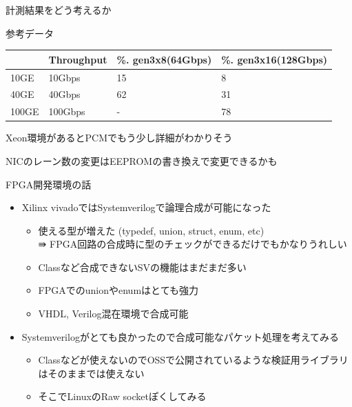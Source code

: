 \documentclass[10pt, compress]{beamer}
\begin{document}

\begin{frame}[fragile,t]{計測結果をどう考えるか}
	\vspace{-2em}
	\begin{figure}
		\resizebox{.8\textwidth}{!}{}
	\end{figure}
	\vspace{-2em}

	\begin{table}
	\small{参考データ}
	\begin{tabular}{l|l|l|l}
		\toprule
		  & Throughput & \%. gen3x8(64Gbps) & \%. gen3x16(128Gbps) \\
		\midrule
		10GE & 10Gbps & 15  & 8 \\
		40GE & 40Gbps & 62  & 31 \\
		100GE & 100Gbps & - & 78 \\
		\bottomrule
	\end{tabular}
	\end{table}

	\small{Xeon環境があるとPCMでもう少し詳細がわかりそう}

	\small{NICのレーン数の変更はEEPROMの書き換えで変更できるかも}

\end{frame}




\begin{frame}[fragile,t]{FPGA開発環境の話}
\begin{itemize}
	\item Xilinx vivadoではSystemverilogで論理合成が可能になった
	\vspace{-0.7em}
	\begin{itemize}
		\item 使える型が増えた (typedef, union, struct, enum, etc) \\
		      ⇛ FPGA回路の合成時に型のチェックができるだけでもかなりうれしい
		\item Classなど合成できないSVの機能はまだまだ多い
		\item FPGAでのunionやenumはとても強力
		\item VHDL, Verilog混在環境で合成可能
	\end{itemize}
	\item Systemverilogがとても良かったので合成可能なパケット処理を考えてみる
	\begin{itemize}
		\item Classなどが使えないのでOSSで公開されているような検証用ライブラリはそのままでは使えない
		\item そこでLinuxのRaw socketぽくしてみる
	\end{itemize}
\end{itemize}
\end{frame}
\end{document}
